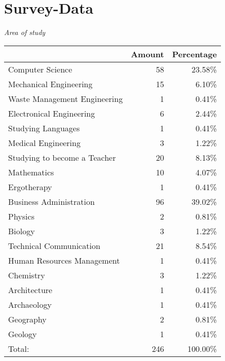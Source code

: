 \chapter{Survey-Data}
\label{cha:survey_data}

\begin{enumerate2}
	\item \emph{Area of study} \newline
		\begin{table}[h!]
			\hspace{18pt}
			\begin{tabular}{l|rr}
				& Amount	& Percentage \\	
				\hline
				Computer Science				& 58		& 23.58\% \\
				Mechanical Engineering			& 15		& 6.10\% \\
				Waste Management Engineering	& 1			& 0.41\% \\
				Electronical Engineering		& 6			& 2.44\% \\
				Studying Languages				& 1			& 0.41\% \\
				Medical Engineering				& 3			& 1.22\% \\
				Studying to become a Teacher	& 20		& 8.13\% \\
				Mathematics						& 10		& 4.07\% \\
				Ergotherapy						& 1			& 0.41\% \\
				Business Administration			& 96		& 39.02\% \\
				Physics							& 2			& 0.81\% \\
				Biology							& 3			& 1.22\% \\
				Technical Communication			& 21		& 8.54\% \\
				Human Resources Management		& 1			& 0.41\% \\
				Chemistry						& 3			& 1.22\% \\
				Architecture					& 1			& 0.41\% \\
				Archaeology						& 1			& 0.41\% \\
				Geography						& 2			& 0.81\% \\
				Geology							& 1			& 0.41\% \\
				\hline
				Total:							& 246		& 100.00\% \\
			\end{tabular}
		\end{table}
	
		\clearpage
	

\end{enumerate2}
